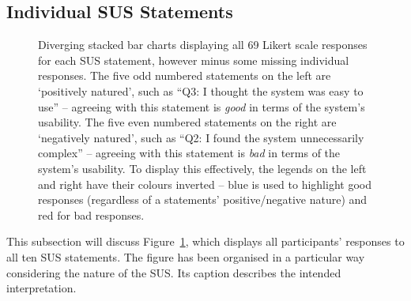 \subsection{Individual SUS Statements}
\label{SUS_INDIV}
  
  \begin{figure}[ht]
    \centering
    \caption{Diverging stacked bar charts \cite{HEIBERGER:DSBC:2014} displaying all 69 Likert scale responses for each SUS statement, however minus some missing individual responses. The five odd numbered statements on the left are `positively natured', such as ``Q3: I thought the system was easy to use'' -- agreeing with this statement is \emph{good} in terms of the system's usability. The five even numbered statements on the right are `negatively natured', such as ``Q2: I found the system unnecessarily complex'' -- agreeing with this statement is \emph{bad} in terms of the system's usability. To display this effectively, the legends on the left and right have their colours inverted -- blue is used to highlight good responses (regardless of a statements' positive/negative nature) and red for bad responses.}
    \label{SUS_QS}
  \end{figure}
  
  This subsection will discuss Figure~\ref{SUS_QS}, which displays all participants' responses to all ten SUS statements. The figure has been organised in a particular way considering the nature of the SUS. Its caption describes the intended interpretation.
  
